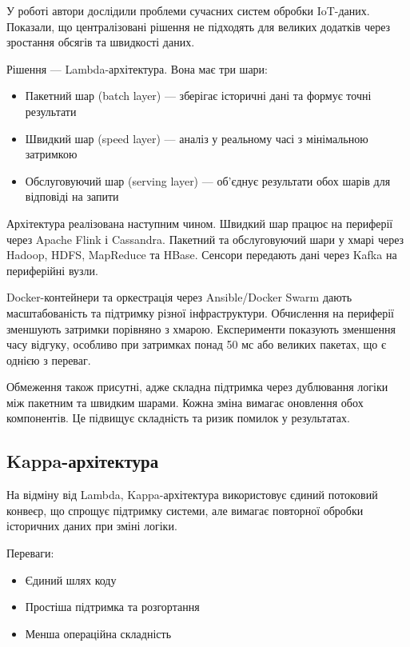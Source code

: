 У роботі \cite{schrabauer2021lambda} автори дослідили проблеми сучасних систем обробки IoT-даних. Показали, що централізовані рішення не підходять для великих додатків через зростання обсягів та швидкості даних.

Рішення --- Lambda-архітектура. Вона має три шари:

\begin{itemize}
    \item Пакетний шар (batch layer) --- зберігає історичні дані та формує точні результати
    \item Швидкий шар (speed layer) --- аналіз у реальному часі з мінімальною затримкою
    \item Обслуговуючий шар (serving layer) --- об'єднує результати обох шарів для відповіді на запити
\end{itemize}

Архітектура реалізована наступним чином. Швидкий шар працює на периферії через Apache Flink і Cassandra. Пакетний та обслуговуючий шари у хмарі через Hadoop, HDFS, MapReduce та HBase. Сенсори передають дані через Kafka на периферійні вузли.

Docker-контейнери та оркестрація через Ansible/Docker Swarm дають масштабованість та підтримку різної інфраструктури. Обчислення на периферії зменшують затримки порівняно з хмарою. Експерименти показують зменшення часу відгуку, особливо при затримках понад 50 мс або великих пакетах, що є однією з переваг.

Обмеження також присутні, адже складна підтримка через дублювання логіки між пакетним та швидким шарами. Кожна зміна вимагає оновлення обох компонентів. Це підвищує складність та ризик помилок у результатах.

\subsection{Kappa-архітектура}

На відміну від Lambda, Kappa-архітектура \cite{nkamla2022optimized} використовує єдиний потоковий конвеєр, що спрощує підтримку системи, але вимагає повторної обробки історичних даних при зміні логіки.

Переваги:
\begin{itemize}
    \item Єдиний шлях коду
    \item Простіша підтримка та розгортання
    \item Менша операційна складність
\end{itemize}

